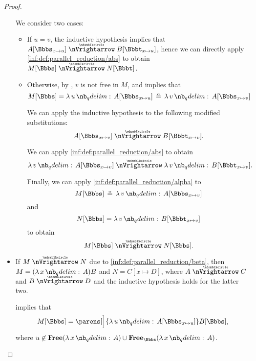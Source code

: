 \begin{proof}
\begin{itemize}
    We consider two cases:
    \begin{itemize}
      \item If \( u = v \), the inductive hypothesis implies that \( A[\Bbbs_{x \mapsto u}] \ppred B[\Bbbt_{x \mapsto u}] \), hence we can directly apply \ref{inf:def:parallel_reduction/abs} to obtain \( M[\Bbbs] \ppred N[\Bbbt] \).

      \item Otherwise, by , \( v \) is not free in \( M \), and  implies that
      \begin{equation*}
        M[\Bbbs]
        =
        \qabs u A[\Bbbs_{x \mapsto u}]
        \aequiv
        \qabs v A[\Bbbs_{x \mapsto v}]
      \end{equation*}

      We can apply the inductive hypothesis to the following modified substitutions:
      \begin{equation*}
        A[\Bbbs_{x \mapsto v}] \ppred B[\Bbbt_{x \mapsto v}].
      \end{equation*}

      We can apply \ref{inf:def:parallel_reduction/abs} to obtain
      \begin{equation*}
        \qabs v A[\Bbbs_{x \mapsto v}] \ppred \qabs v B[\Bbbt_{x \mapsto v}].
      \end{equation*}

      Finally, we can apply \ref{inf:def:parallel_reduction/alpha} to
      \begin{equation*}
        M[\Bbbs] \aequiv \qabs v A[\Bbbs_{x \mapsto v}]
      \end{equation*}
      and
      \begin{equation*}
        N[\Bbbs] = \qabs v B[\Bbbt_{x \mapsto v}]
      \end{equation*}
      to obtain
      \begin{equation*}
        M[\Bbbs] \ppred N[\Bbbs].
      \end{equation*}
    \end{itemize}

    \item If \( M \ppred N \) due to \ref{inf:def:parallel_reduction/beta}, then \( M = (\qabs x A)B \) and \( N = C[x \mapsto D] \), where \( A \ppred C \) and \( B \ppred D \) and the inductive hypothesis holds for the latter two.

     implies that
    \begin{equation*}
      M[\Bbbs] = \parens[\Big]{ \qabs u A[\Bbbs_{x \mapsto u}] } B[\Bbbs],
    \end{equation*}
    where \( u \not\in \op*{Free}(\qabs x A) \cup \op*{Free}_\Bbbs(\qabs x A) \).


\end{itemize}
\end{proof}
